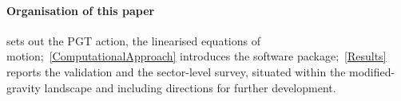 \paragraph*{Organisation of this paper}
 sets out the PGT action, the
linearised equations of motion;~\cref{ComputationalApproach} introduces
the \TIDAL{} software package;~\cref{Results} reports the
validation and the sector-level survey, situated
within the modified-gravity landscape and including
directions for further development.
